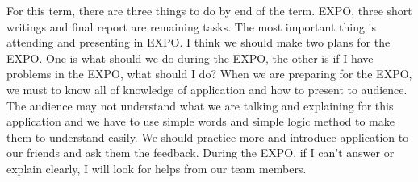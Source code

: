 For this term, there are three things to do by end of the term.
EXPO, three short writings and final report are remaining tasks.
The most important thing is attending and presenting in EXPO. 
I think we should make two plans for the EXPO.
One is what should we do during the EXPO, the other is if I have problems in the EXPO, what should I do?
When we are preparing for the EXPO, we must to know all of knowledge of application and how to present to audience.
The audience may not understand what we are talking and explaining for this application and we have to use simple words and simple logic method to make them to understand easily.
We should practice more and introduce application to our friends and ask them the feedback.
During the EXPO, if I can't answer or explain clearly, I will look for helps from our team members.

